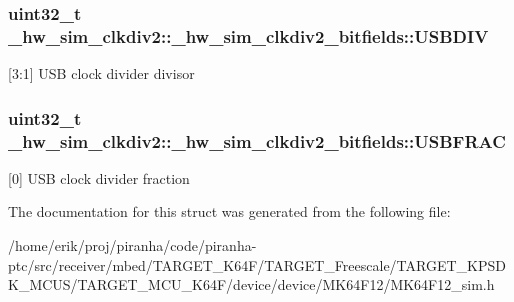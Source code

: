 \subsubsection[{\texorpdfstring{U\+S\+B\+D\+IV}{USBDIV}}]{\setlength{\rightskip}{0pt plus 5cm}uint32\+\_\+t \+\_\+hw\+\_\+sim\+\_\+clkdiv2\+::\+\_\+hw\+\_\+sim\+\_\+clkdiv2\+\_\+bitfields\+::\+U\+S\+B\+D\+IV}\hypertarget{struct__hw__sim__clkdiv2_1_1__hw__sim__clkdiv2__bitfields_a43c73aeb258926bd19c95eb576be7e3c}{}\label{struct__hw__sim__clkdiv2_1_1__hw__sim__clkdiv2__bitfields_a43c73aeb258926bd19c95eb576be7e3c}
\mbox{[}3\+:1\mbox{]} U\+SB clock divider divisor 
\subsubsection[{\texorpdfstring{U\+S\+B\+F\+R\+AC}{USBFRAC}}]{\setlength{\rightskip}{0pt plus 5cm}uint32\+\_\+t \+\_\+hw\+\_\+sim\+\_\+clkdiv2\+::\+\_\+hw\+\_\+sim\+\_\+clkdiv2\+\_\+bitfields\+::\+U\+S\+B\+F\+R\+AC}\hypertarget{struct__hw__sim__clkdiv2_1_1__hw__sim__clkdiv2__bitfields_a82ac7c465612398276e2c4e918ab25b1}{}\label{struct__hw__sim__clkdiv2_1_1__hw__sim__clkdiv2__bitfields_a82ac7c465612398276e2c4e918ab25b1}
\mbox{[}0\mbox{]} U\+SB clock divider fraction 

The documentation for this struct was generated from the following file\+:\begin{DoxyCompactItemize}
\item 
/home/erik/proj/piranha/code/piranha-\/ptc/src/receiver/mbed/\+T\+A\+R\+G\+E\+T\+\_\+\+K64\+F/\+T\+A\+R\+G\+E\+T\+\_\+\+Freescale/\+T\+A\+R\+G\+E\+T\+\_\+\+K\+P\+S\+D\+K\+\_\+\+M\+C\+U\+S/\+T\+A\+R\+G\+E\+T\+\_\+\+M\+C\+U\+\_\+\+K64\+F/device/device/\+M\+K64\+F12/M\+K64\+F12\+\_\+sim.\+h\end{DoxyCompactItemize}
